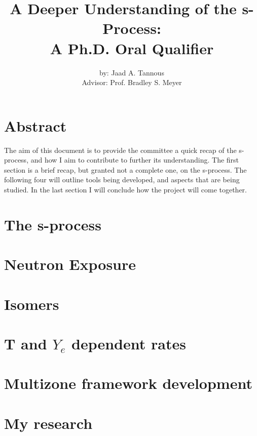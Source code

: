 \documentclass{article}
\title{A Deeper Understanding of the s-Process:\\
A Ph.D. Oral Qualifier}
\author{by: Jaad A. Tannous\\
Advisor: Prof. Bradley S. Meyer}
\date{}
\begin{document}
\maketitle

\section*{Abstract}
The aim of this document is to provide the committee a quick recap of the s-process, and how I aim to 
contribute to further its understanding. The first section is a brief recap, but granted not a complete 
one, on the s-process. The following four will outline tools being developed, and aspects that are being 
studied. In the last section I will conclude how the project will come together.
\section*{The s-process}
\section*{Neutron Exposure}
\section*{Isomers}
\section*{T and $Y_{e}$ dependent rates}
\section*{Multizone framework development}
\section*{My research}
\end{document}
